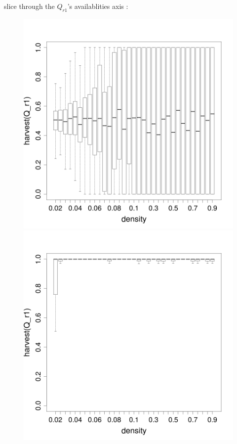 \documentclass[8pt, handout=show,notes=show]{beamer}
\begin{document}
\begin{frame}{slice through the $Q_{r1}$'s availablities axis : }

\begin{figure}[H]
\includegraphics[width=\imgSize]{images/harvestr1_density_r1-50.png}
\includegraphics[width=\imgSize]{images/harvestr1_density_r1-70.png}\\

\end{figure}
\end{frame}
\end{document}
